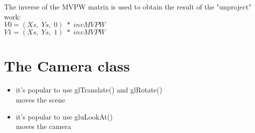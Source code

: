 \documentclass[a4paper,12pt]{book}
\begin{document}
The inverse of the MVPW matrix is used to obtain the result of the "unproject" work:\\
$V0=(Xs, \; Ys, \; 0) \; * \; invMVPW$\\
$V1 = (Xs, \; Ys, \; 1) \; * \; invMVPW$\\

\section{The Camera class}
\begin{itemize}
\item it's popular to use glTranslate() and glRotate()\\
\textrightarrow moves the scene
\item it's popular to use gluLookAt()\\
\textrightarrow moves the camera


\end{itemize}
\end{document}
